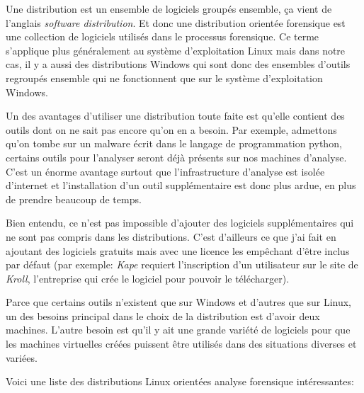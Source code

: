 Une distribution est un ensemble de logiciels groupés ensemble, ça vient de l'anglais \textit{software distribution}. Et donc une distribution orientée forensique est une collection de logiciels utilisés dans le processus forensique. Ce terme s'applique plus généralement au système d'exploitation Linux mais dans notre cas, il y a aussi des distributions Windows qui sont donc des ensembles d'outils regroupés ensemble qui ne fonctionnent que sur le système d'exploitation Windows.

Un des avantages d'utiliser une distribution toute faite est qu'elle contient des outils dont on ne sait pas encore qu'on en a besoin. Par exemple, admettons qu'on tombe sur un malware écrit dans le langage de programmation python, certains outils pour l'analyser seront déjà présents sur nos machines d'analyse. C'est un énorme avantage surtout que l'infrastructure d'analyse est isolée d'internet et l'installation d'un outil supplémentaire est donc plus ardue, en plus de prendre beaucoup de temps.

Bien entendu, ce n'est pas impossible d'ajouter des logiciels supplémentaires qui ne sont pas compris dans les distributions. C'est d'ailleurs ce que j'ai fait en ajoutant des logiciels gratuits mais avec une licence les empêchant d'être inclus par défaut (par exemple: \textit{Kape} requiert l'inscription d'un utilisateur sur le site de \textit{Kroll}, l'entreprise qui crée le logiciel pour pouvoir le télécharger).

Parce que certains outils n'existent que sur Windows et d'autres que sur Linux, un des besoins principal dans le choix de la distribution est d'avoir deux machines. L'autre besoin est qu'il y ait une grande variété de logiciels pour que les machines virtuelles créées puissent être utilisés dans des situations diverses et variées.

Voici une liste des distributions Linux orientées analyse forensique intéressantes:

